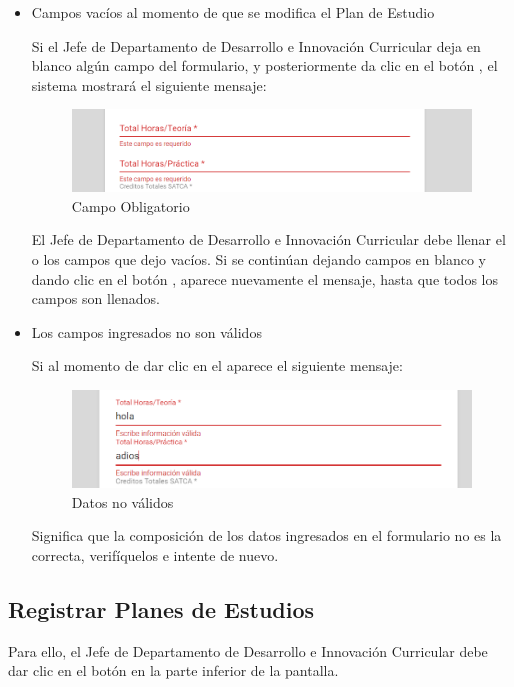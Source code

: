 \begin{itemize}
	\item Campos vacíos al momento de que se modifica el Plan de Estudio

	Si el Jefe de Departamento de Desarrollo e Innovación Curricular deja en blanco algún campo del formulario, y posteriormente da clic en el botón  , el sistema mostrará el siguiente mensaje:

		\begin{figure}[H]
		\centering
		\hypertarget{ms4}{\includegraphics[width=0.7\linewidth]{images/SP4-GPE/m4}}
		\caption{Campo Obligatorio}
		\label{ms4}
	\end{figure}

	 El Jefe de Departamento de Desarrollo e Innovación Curricular debe llenar el o los campos que dejo vacíos. Si se continúan dejando campos en blanco y dando clic en el botón  , aparece nuevamente el mensaje, hasta que todos los campos son llenados.


	\item Los campos ingresados no son válidos

	Si al momento de dar clic en el  aparece el siguiente mensaje:
	\begin{figure}[H]
		\centering
		\hypertarget{ms5}{\includegraphics[width=0.7\linewidth]{images/SP4-GPE/m5}}
		\caption{Datos no válidos}
		\label{ms5}
	\end{figure}

	Significa que la composición de los datos ingresados en el formulario no es la correcta, verifíquelos e intente de nuevo.

\end{itemize}


\newpage
\subsection{Registrar Planes de Estudios}

Para ello, el Jefe de Departamento de Desarrollo e Innovación Curricular debe dar clic en el botón \IUbutton{+} en la parte inferior de la pantalla.

